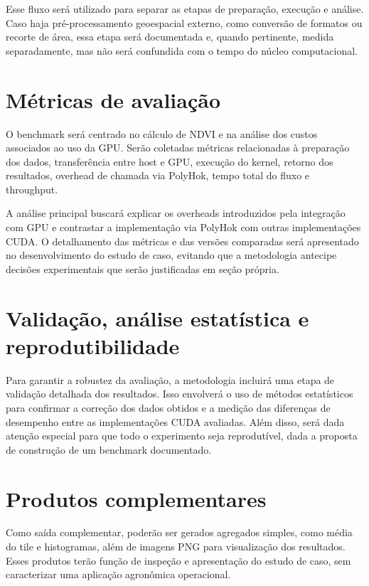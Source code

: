 \documentclass[tcc,capa]{texufpel}
\begin{document}
Esse fluxo será utilizado para separar as etapas de preparação, execução e análise. Caso haja pré-processamento geoespacial externo, como conversão de formatos ou recorte de área, essa etapa será documentada e, quando pertinente, medida separadamente, mas não será confundida com o tempo do núcleo computacional.

\section{Métricas de avaliação}

O benchmark será centrado no cálculo de NDVI e na análise dos custos associados ao uso da GPU. Serão coletadas métricas relacionadas à preparação dos dados, transferência entre host e GPU, execução do kernel, retorno dos resultados, overhead de chamada via PolyHok, tempo total do fluxo e throughput.

A análise principal buscará explicar os overheads introduzidos pela integração com GPU e contrastar a implementação via PolyHok com outras implementações CUDA. O detalhamento das métricas e das versões comparadas será apresentado no desenvolvimento do estudo de caso, evitando que a metodologia antecipe decisões experimentais que serão justificadas em seção própria.

\section{Validação, análise estatística e reprodutibilidade}

Para garantir a robustez da avaliação, a metodologia incluirá uma etapa de validação detalhada dos resultados. Isso envolverá o uso de métodos estatísticos para confirmar a correção dos dados obtidos e a medição das diferenças de desempenho entre as implementações CUDA avaliadas. Além disso, será dada atenção especial para que todo o experimento seja reprodutível, dada a proposta de construção de um benchmark documentado.

\section{Produtos complementares}

Como saída complementar, poderão ser gerados agregados simples, como média do tile e histogramas, além de imagens PNG para visualização dos resultados. Esses produtos terão função de inspeção e apresentação do estudo de caso, sem caracterizar uma aplicação agronômica operacional.
\end{document}
